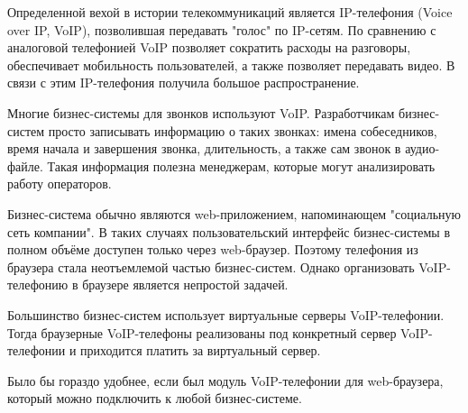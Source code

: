 \intro
Определенной вехой в истории телекоммуникаций является IP-телефония (Voice over IP, VoIP), позволившая передавать "голос" по IP-сетям. По сравнению с аналоговой телефонией VoIP позволяет сократить расходы на разговоры, обеспечивает мобильность пользователей, а также позволяет передавать видео. В связи с этим IP-телефония получила большое распространение.

Многие бизнес-системы для звонков используют VoIP. Разработчикам бизнес-систем просто записывать информацию о таких звонках: имена собеседников, время начала и завершения звонка, длительность, а также сам звонок в аудио-файле. Такая информация полезна менеджерам, которые могут анализировать работу операторов.

Бизнес-система обычно являются web-приложением, напоминающем "социальную сеть компании". В таких случаях пользовательский интерфейс бизнес-системы в полном объёме доступен только через web-браузер. Поэтому телефония из браузера стала неотъемлемой частью бизнес-систем. Однако организовать VoIP-телефонию в браузере является непростой задачей.

Большинство бизнес-систем использует виртуальные серверы VoIP-телефонии. Тогда браузерные VoIP-телефоны реализованы под конкретный сервер VoIP-телефонии и приходится платить за виртуальный сервер.

Было бы гораздо удобнее, если был модуль VoIP-телефонии для web-браузера, который можно подключить к любой бизнес-системе.

